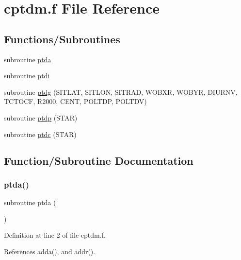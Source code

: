 \hypertarget{cptdm_8f}{}\section{cptdm.\+f File Reference}
\label{cptdm_8f}
\subsection*{Functions/\+Subroutines}
\begin{DoxyCompactItemize}
\item 
subroutine \hyperlink{cptdm_8f_aababac2fa25d6c5956f46f825d3312a4}{ptda}
\item 
subroutine \hyperlink{cptdm_8f_a87538f3fc5fa26902164adbb4d73b400}{ptdi}
\item 
subroutine \hyperlink{cptdm_8f_a32ca03878e53b3fb9571d2fdc830b836}{ptdg} (S\+I\+T\+L\+AT, S\+I\+T\+L\+ON, S\+I\+T\+R\+AD, W\+O\+B\+XR, W\+O\+B\+YR, D\+I\+U\+R\+NV, T\+C\+T\+O\+CF, R2000, C\+E\+NT, P\+O\+L\+T\+DP, P\+O\+L\+T\+DV)
\item 
subroutine \hyperlink{cptdm_8f_a76fce9f19de9d44ffba70d730a87f394}{ptdp} (S\+T\+AR)
\item 
subroutine \hyperlink{cptdm_8f_a30f1e3d26cf859d6c470219a1ad16b48}{ptdc} (S\+T\+AR)
\end{DoxyCompactItemize}


\subsection{Function/\+Subroutine Documentation}
\mbox{\label{cptdm_8f_aababac2fa25d6c5956f46f825d3312a4}} 
\subsubsection{\texorpdfstring{ptda()}{ptda()}}
{\footnotesize\ttfamily subroutine ptda (\begin{DoxyParamCaption}{ }\end{DoxyParamCaption})}



Definition at line 2 of file cptdm.\+f.



References adda(), and addr().

\mbox{\label{cptdm_8f_a30f1e3d26cf859d6c470219a1ad16b48}} 
